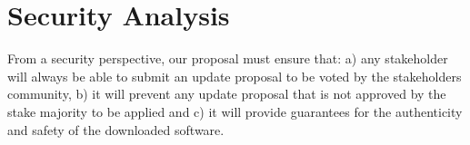 \section{Security Analysis}
From a security perspective, our proposal must ensure that:
a) any stakeholder will always be able to submit an update proposal to be voted by the stakeholders community, b) it will prevent any update proposal that is not approved by the stake majority to be applied and c) it will provide guarantees for the authenticity and safety of the downloaded software.